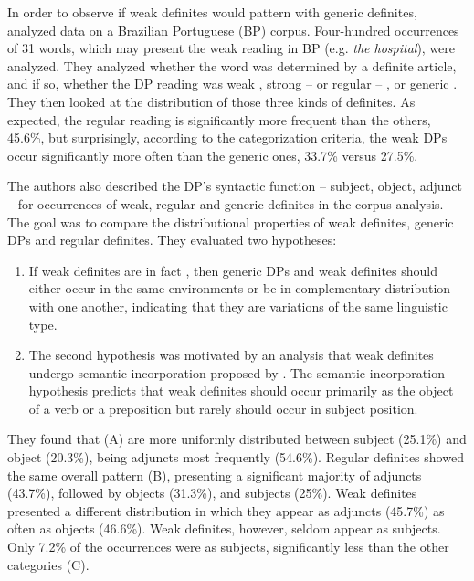 \documentclass[output=paper,
modfonts
]{langscibook}
\begin{document}
In order to observe if weak definites would pattern with generic definites, \citet{deSaEtAlii2016} analyzed data on a Brazilian Portuguese (BP) corpus. Four-hundred occurrences of 31 words, which may present the weak reading in BP (e.g. \textit{the hospital}), were analyzed. They analyzed whether the word was determined by a definite article, and if so, whether the DP reading was weak \citep{CarlsonSussman2005}, strong -- or regular -- \citep{Russell1905}, or generic \citep{Carlson2006}. They then looked at the distribution of those three kinds of definites. As expected, the regular reading is significantly more frequent than the others, 45.6\%, but surprisingly, according to the categorization criteria, the weak DPs occur significantly more often than the generic ones, 33.7\% versus 27.5\%.

The authors also described the DP’s syntactic function -- subject, object, adjunct -- for occurrences of weak, regular and generic definites in the corpus analysis. The goal was to compare the distributional properties of weak definites, generic DPs and regular definites.  They evaluated two hypotheses:
\begin{enumerate}
\item If weak definites are in fact ,  then generic DPs and weak definites should either occur in the same environments or be in complementary distribution with one another, indicating that they are variations of the same linguistic type. \newpage
\item The second hypothesis was motivated by an analysis that weak definites undergo semantic incorporation proposed by \citet{CarlsonEtAlii2013}. The semantic incorporation hypothesis predicts that weak definites should occur primarily as the object of a verb or a preposition but rarely should occur in subject position.
\end{enumerate}


They found that  (A) are more uniformly distributed between subject (25.1\%) and object (20.3\%), being adjuncts most frequently (54.6\%). Regular definites showed the same overall pattern (B), presenting a significant majority of adjuncts (43.7\%), followed by objects (31.3\%), and subjects (25\%). Weak definites presented a different distribution in which they appear as adjuncts (45.7\%) as often as objects (46.6\%). Weak definites, however, seldom appear as subjects.  Only 7.2\% of the occurrences were as subjects, significantly less than the other categories (C).
\end{document}
